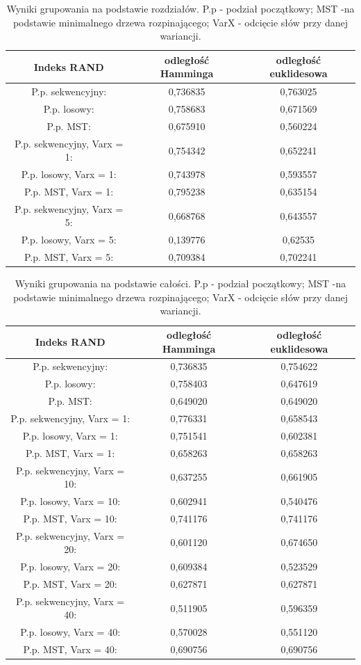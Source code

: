 \documentclass{article}
\begin{document}
\begin{table}[H]
	\centering
	\begin{tabular}{c|c|c}
		Indeks RAND & odległość Hamminga & odległość euklidesowa \\ \hline
		P.p. sekwencyjny: & 0,736835 & 0,763025 \\ \hline
		P.p. losowy: & 0,758683 & 0,671569 \\ \hline
		P.p. MST: & 0,675910 & 0,560224 \\ \hline
		P.p. sekwencyjny, Varx = 1: & 0,754342 & 0,652241 \\ \hline
		P.p. losowy, Varx = 1: & 0,743978 & 0,593557 \\ \hline
		P.p. MST, Varx = 1: & 0,795238 & 0,635154 \\ \hline
		P.p. sekwencyjny, Varx = 5: & 0,668768 & 0,643557 \\ \hline
		P.p. losowy, Varx = 5: & 0,139776 & 0,62535  \\ \hline
		P.p. MST, Varx = 5: & 0,709384 & 0,702241
	\end{tabular}
	\caption{Wyniki grupowania na podstawie rozdziałów. P.p - podział początkowy; MST -na podstawie minimalnego drzewa rozpinającego; VarX - odcięcie słów przy danej wariancji.}
	\label{tab:rozwyniki}
\end{table}

\begin{table}[H]
	\centering
	\begin{tabular}{c|c|c}
		Indeks RAND & odległość Hamminga & odległość euklidesowa \\ \hline
		P.p. sekwencyjny: & 0,736835 & 0,754622 \\ \hline
		P.p. losowy: & 0,758403 & 0,647619  \\ \hline
		P.p. MST: & 0,649020 & 0,649020 \\ \hline
		P.p. sekwencyjny, Varx = 1: & 0,776331 & 0,658543 \\ \hline
		P.p. losowy, Varx = 1: & 0,751541 & 0,602381  \\ \hline
		P.p. MST, Varx = 1: & 0,658263 & 0,658263 \\ \hline
		P.p. sekwencyjny, Varx = 10: & 0,637255 & 0,661905 \\ \hline
		P.p. losowy, Varx = 10: & 0,602941 & 0,540476  \\ \hline
		P.p. MST, Varx = 10: & 0,741176 & 0,741176 \\ \hline
		P.p. sekwencyjny, Varx = 20: & 0,601120 & 0,674650 \\ \hline
		P.p. losowy, Varx = 20: & 0,609384 & 0,523529  \\ \hline
		P.p. MST, Varx = 20: & 0,627871 & 0,627871 \\ \hline
		P.p. sekwencyjny, Varx = 40: & 0,511905 & 0,596359 \\ \hline
		P.p. losowy, Varx = 40: & 0,570028 & 0,551120  \\ \hline
		P.p. MST, Varx = 40: & 0,690756 & 0,690756
	\end{tabular}
	\caption{Wyniki grupowania na podstawie całości. P.p - podział początkowy; MST -na podstawie minimalnego drzewa rozpinającego; VarX - odcięcie słów przy danej wariancji.}
	\label{tab:calwyniki}
\end{table}
\end{document}
